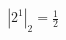 \documentclass[preview]{standalone}
\begin{document}
\begin{align*}
\left| 2^{1} \right|_2 = \frac{1}{2}
\end{align*}
\end{document}
